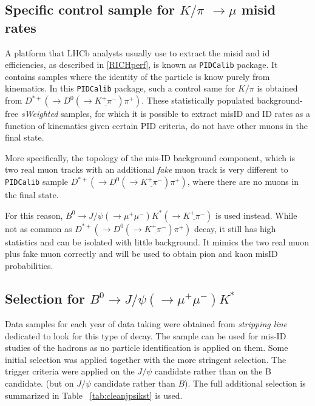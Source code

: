 \subsection{Specific control sample for $K/\pi$ $\rightarrow \mu$ misid rates }
\label{extraction}
A platform that \gls{LHCb} analysts usually use to extract the misid and id efficiencies, as described in \autoref{RICHperf}, is known as \texttt{PIDCalib} package. It contains samples where the identity of the particle is know purely from kinematics.  In this \texttt{PIDCalib} package, such a control same for $K/\pi$ is obtained from $D^{*+}(\rightarrow D^{0}(\rightarrow \underline{K^{+} \pi^{-}}) \pi^{+})$. These statistically populated background-free \textit{sWeighted} samples, for which it is possible to extract misID and ID rates as a function of kinematics given certain \gls{PID} criteria, do not have other muons in the final state. 

More specifically, the topology of the mis-ID background component, which is two real muon tracks with an additional \textit{fake} muon track is very different to \texttt{PIDCalib} sample $D^{*+}(\rightarrow D^{0}(\rightarrow \underline{K^{+} \pi^{-}}) \pi^{+})$, where there are no muons in the final state.


For this reason, $B^{0} \rightarrow J/\psi(\rightarrow \mu^{+} \mu^{-}) K^{*}(\rightarrow \underline{K^{+} \pi^{-}})$ is used instead. While not as common as $D^{*+}(\rightarrow D^{0}(\rightarrow \underline{K^{+} \pi^{-}}) \pi^{+})$ decay, it still has high statistics and can be isolated with little background. It mimics the two real muon plus fake muon correctly and will be used to obtain pion and kaon misID probabilities.

\subsection{Selection for $B^{0} \rightarrow J/\psi(\rightarrow \mu^{+} \mu^{-}) K^{*}$  }
Data samples for each year of data taking were obtained from \textit{stripping line} dedicated to look for this type of decay. The sample can be used for mis-ID studies of the hadrons as no particle identification is applied on them. Some initial selection was applied together with the more stringent \Bmumumu selection.  The trigger criteria were applied on the $J/\psi$ candidate rather than on the B candidate. (but on $J/\psi$ candidate rather than $B$). The full additional selection is summarized in Table ~\ref{tab:cleanjpsikst} is used.


